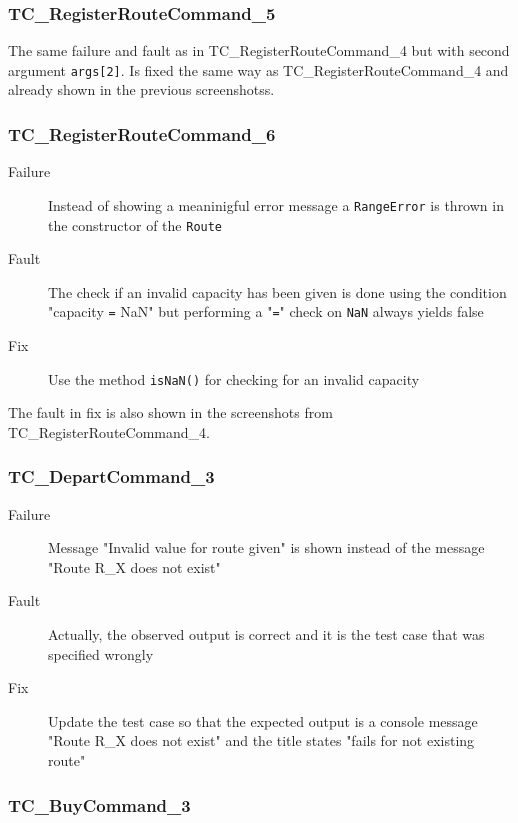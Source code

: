 \documentclass[11pt]{article}
\begin{document}
\subsubsection{TC\_RegisterRouteCommand\_5}
\label{sec:orgad308dc}

The same failure and fault as in TC\_RegisterRouteCommand\_4 but with second argument \texttt{args[2]}. Is fixed the same way as TC\_RegisterRouteCommand\_4 and already shown in the previous screenshotss.

\subsubsection{TC\_RegisterRouteCommand\_6}
\label{sec:orgf559bc0}

\begin{description}
\item[{Failure}] Instead of showing a meaninigful error message a \texttt{RangeError} is thrown in the constructor of the \texttt{Route}
\item[{Fault}] The check if an invalid capacity has been given is done using the condition "capacity \texttt{=} NaN" but performing a "\texttt{=}" check on \texttt{NaN} always yields false
\item[{Fix}] Use the method \texttt{isNaN()} for checking for an invalid capacity
\end{description}
The fault in fix is also shown in the screenshots from TC\_RegisterRouteCommand\_4.

\subsubsection{TC\_DepartCommand\_3}
\label{sec:org41b2d53}

\begin{description}
\item[{Failure}] Message "Invalid value for route given" is shown instead of the message "Route R\_X does not exist"
\item[{Fault}] Actually, the observed output is correct and it is the test case that was specified wrongly
\item[{Fix}] Update the test case so that the expected output is a console message "Route R\_X does not exist" and the title states "fails for not existing route"
\end{description}

\subsubsection{TC\_BuyCommand\_3}
\label{sec:orgd272714}
\end{document}
